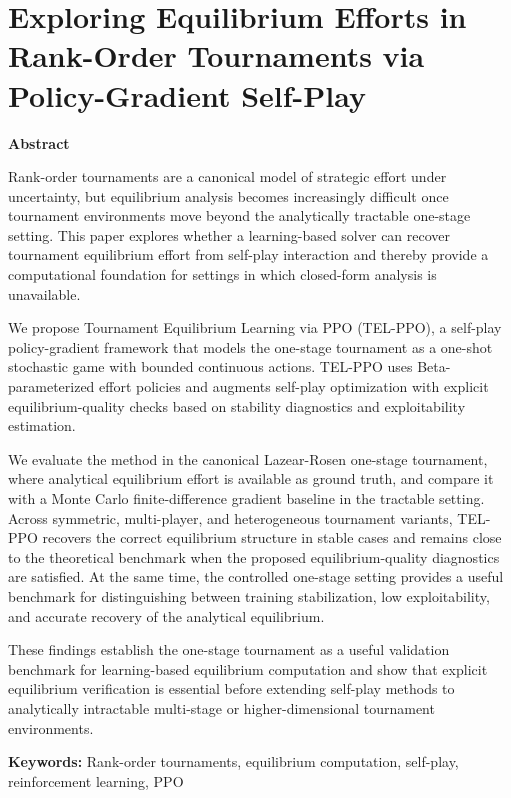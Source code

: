 \documentclass[
]{article}
\author{}
\date{}
\begin{document}
\section{Exploring Equilibrium Efforts in Rank-Order Tournaments via
Policy-Gradient
Self-Play}\label{exploring-equilibrium-efforts-in-rank-order-tournaments-via-policy-gradient-self-play}

\textbf{Abstract}

Rank-order tournaments are a canonical model of strategic effort under
uncertainty, but equilibrium analysis becomes increasingly difficult
once tournament environments move beyond the analytically tractable
one-stage setting. This paper explores whether a learning-based solver
can recover tournament equilibrium effort from self-play interaction and
thereby provide a computational foundation for settings in which
closed-form analysis is unavailable.

We propose Tournament Equilibrium Learning via PPO (TEL-PPO), a
self-play policy-gradient framework that models the one-stage tournament
as a one-shot stochastic game with bounded continuous actions. TEL-PPO
uses Beta-parameterized effort policies and augments self-play
optimization with explicit equilibrium-quality checks based on stability
diagnostics and exploitability estimation.

We evaluate the method in the canonical Lazear-Rosen one-stage
tournament, where analytical equilibrium effort is available as ground
truth, and compare it with a Monte Carlo finite-difference gradient
baseline in the tractable setting. Across symmetric, multi-player, and
heterogeneous tournament variants, TEL-PPO recovers the correct
equilibrium structure in stable cases and remains close to the
theoretical benchmark when the proposed equilibrium-quality diagnostics
are satisfied. At the same time, the controlled one-stage setting
provides a useful benchmark for distinguishing between training
stabilization, low exploitability, and accurate recovery of the
analytical equilibrium.

These findings establish the one-stage tournament as a useful validation
benchmark for learning-based equilibrium computation and show that
explicit equilibrium verification is essential before extending
self-play methods to analytically intractable multi-stage or
higher-dimensional tournament environments.

\textbf{Keywords:} Rank-order tournaments, equilibrium computation,
self-play, reinforcement learning, PPO
\end{document}
